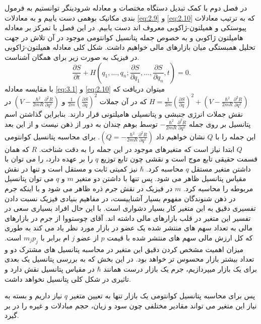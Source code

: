 \documentclass[a4paper,titlepage,12pt,fleqn,oneside]{report}
\begin{document}
	در فصل دوم  با کمک تبدیل دستگاه مختصات و معادله شرودینگر توانستیم به فرمول بندی مکانیک بوهمی دست یابیم و به معادلات \ref{eq:2.9} و  \ref{eq:2.10} که به ترتیب معادلات پیوستکی و همیلتون-ژاکوبی معروف اند دست یابیم. در این فصل با تمرکز بر معادله هامیلتون ژاکوبی و به خصوص جمله پتانسیل کوانتومی موجود در آن تلاش در جهت تحلیل همبستگی میان بازارهای مالی خواهیم داشت. شکل کلی معادله همیلتون-ژاکوبی در فیزیک به صورت زیر برای همگان آشناست.
	\begin{equation}
		\frac{\partial S}{\partial t} +H\left(q_1, ...,q_n; \frac{\partial S}{\partial q_1}, ...,\frac{\partial S}{\partial q_n}, t\right) =0.
		\label{eq:3.1}
	\end{equation}
	با مقایسه معادله \ref{eq:3.1} و \ref{eq:2.10}  میتوان دریافت که 
	$H=\frac{1}{2m} \left(\frac{\partial S}{\partial q}\right)^2+
	\left(V-\frac{\hbar^2}{2mR} \frac{\partial^2 R}{\partial q^2}\right)$
	که در آن جملات
	$\frac{1}{2m} \left(\frac{\partial S}{\partial q}\right)^2$
	و
	$\left(V-\frac{\hbar^2}{2mR} \frac{\partial^2 R}{\partial q^2}\right)$
	در نقش جملات انرژی جنبشی و پتانسیلی هامیلتونی قرار دارند.  بنابراین گذاشتن اسم پتانسیل بر روی جمله 
	$-\frac{\hbar^2}{2mR} \frac{\partial^2 R}{\partial q^2}$
	توسط بوهم چندان به دور از ذهن نیست و از این بعد این جمله را با $Q$ نشان خواهیم داد
	$\left(Q=-\frac{\hbar^2}{2mR} \frac{\partial^2 R}{\partial q^2}\right)$.
	برای محاسبه پتانسیل کوانتومی $Q$ ابتدا نیاز است که متغیرهای موجود در این جمله را به دقت شناخت. $R$  که همان قسمت حقیقی تابع موج است و نقشی چون تابع توزیع $q$ را بر عهده دارد، را می توان با داشتن متغیر مستقل 
	$q$
	محاسبه کرد. $\hbar$ نیز کمیتی ثابت و مستقل است و تنها در نقش مقیاس پتانسیل ظاهر می شود. پس تنها با داشتن دو متغیر $m$ و $q$ می توان پتانسیل مربوطه را محاسبه کرد. $m$ در فیزیک در نقش جرم ذره ظاهر می شود و با اینکه جرم در ذهن شنوندگان مفهوم بسیار آشناییست، در مفاهیم بنیادی فیزیک نسبت دادن تفسیری دقیق به این متغیر کار بسیار دشواری است. با این حال افراد بسیاری سعی در تفسیر این متغیر در قلب بازارهای مالی داشته اند. آقای چوستووا از جرم در بازارهای مالی به تعداد سهم های منتشر شده یک عضو در بازار مورد نظر یاد می کند به طوری که کل ارزش مالی سهم های منتشر شده با قیمت $p$ از عضو $j$ ام برابر با $m_jp_j$  است. میزان اهمیت مشخص کردن دقیق این متغیر در محاسبه پتانسیل های مشترک دو و تعداد بیشتر بازار محسوس تر خواهد بود. در این بخش که به بررسی پتانسیل یک بعدی برای یک بازار میپردازیم، جرم یک بازار درست همانند $\hbar$ در مقیاس پتانسیل نقش دارد و تاثیری در شکل کلی پتانسیل نخواهد داشت. 
	
	پس برای محاسبه پتانسیل کوانتومی یک بازار تنها به تعیین متغیر $q$ نیاز داریم و بسته به نیاز این متغیر می تواند مقادیر مختلفی چون سود و زیان، حجم مبادلات و غیره را در بر گیرد. 
	
\end{document}
